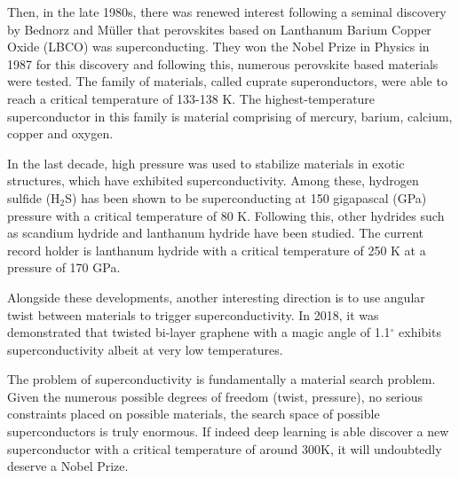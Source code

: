 \documentclass[book.tex]{subfiles}
\begin{document}
Then, in the late 1980s, there was renewed interest following a seminal discovery by Bednorz and M{\"u}ller that perovskites based on Lanthanum Barium Copper Oxide (LBCO) was superconducting.   They won the Nobel Prize in Physics in 1987 for this discovery and following this, numerous perovskite based materials were tested.  The family of materials, called cuprate superonductors, were able to reach a critical temperature of 133-138 K.  The highest-temperature superconductor in this family is material comprising of mercury, barium, calcium, copper and oxygen.  

In the last decade, high pressure was used to stabilize materials in exotic structures, which have exhibited superconductivity.  Among these, hydrogen sulfide (H$_2$S) has been shown to be superconducting at 150 gigapascal (GPa) pressure with a critical temperature of 80 K.  Following this, other hydrides such as scandium hydride and lanthanum hydride have been studied.  The current record holder is lanthanum hydride with a critical temperature of 250 K at a pressure of 170 GPa.  

Alongside these developments, another interesting direction is to use angular twist between materials to trigger superconductivity.  In 2018, it was demonstrated that twisted bi-layer graphene with a magic angle of 1.1$^\circ$ exhibits superconductivity albeit at very low temperatures.  

The problem of superconductivity is fundamentally a material search problem.  Given the numerous possible degrees of freedom (twist, pressure), no serious constraints placed on possible materials, the search space of possible superconductors is truly enormous.  If indeed deep learning is able discover a new superconductor with a critical temperature of around 300K, it will undoubtedly deserve a Nobel Prize.\cite{kitano2016artificial}
\end{document}
